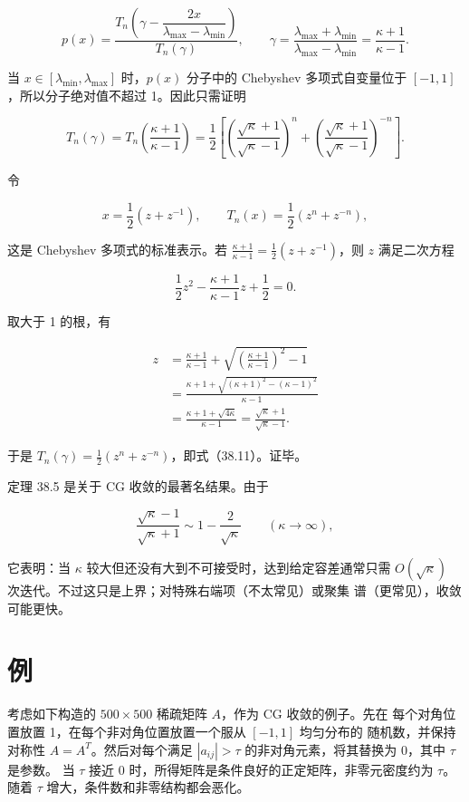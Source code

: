 \documentclass[UTF8,fontset=none,12pt]{ctexart}
\begin{document}
\[
p(x)=
\frac{T_n\!\left(\gamma-\dfrac{2x}{\lambda_{\max}-\lambda_{\min}}\right)}
{T_n(\gamma)},
\qquad
\gamma=\frac{\lambda_{\max}+\lambda_{\min}}
{\lambda_{\max}-\lambda_{\min}}
=\frac{\kappa+1}{\kappa-1}.
\]

当 $x\in[\lambda_{\min},\lambda_{\max}]$ 时，$p(x)$ 分子中的
Chebyshev 多项式自变量位于 $[-1,1]$，所以分子绝对值不超过 1。因此只需证明

\begin{equation}
T_n(\gamma)
=T_n\!\left(\frac{\kappa+1}{\kappa-1}\right)
=\frac12\left[
\left(\frac{\sqrt\kappa+1}{\sqrt\kappa-1}\right)^n+
\left(\frac{\sqrt\kappa+1}{\sqrt\kappa-1}\right)^{-n}
\right].
\tag{38.11}
\end{equation}

令

\[
x=\frac12(z+z^{-1}),\qquad
T_n(x)=\frac12(z^n+z^{-n}),
\]

这是 Chebyshev 多项式的标准表示。若
$\frac{\kappa+1}{\kappa-1}=\frac12(z+z^{-1})$，则 $z$ 满足二次方程

\[
\frac12z^2-\frac{\kappa+1}{\kappa-1}z+\frac12=0.
\]

取大于 1 的根，有

\[
\begin{aligned}
z
&=\frac{\kappa+1}{\kappa-1}
+\sqrt{\left(\frac{\kappa+1}{\kappa-1}\right)^2-1}\\
&=\frac{\kappa+1+\sqrt{(\kappa+1)^2-(\kappa-1)^2}}{\kappa-1}\\
&=\frac{\kappa+1+\sqrt{4\kappa}}{\kappa-1}
=\frac{\sqrt\kappa+1}{\sqrt\kappa-1}.
\end{aligned}
\]

于是 $T_n(\gamma)=\frac12(z^n+z^{-n})$，即式（38.11）。证毕。

定理 38.5 是关于 CG 收敛的最著名结果。由于

\[
\frac{\sqrt\kappa-1}{\sqrt\kappa+1}
\sim1-\frac{2}{\sqrt\kappa}
\qquad(\kappa\to\infty),
\]

它表明：当 $\kappa$ 较大但还没有大到不可接受时，达到给定容差通常只需
$O(\sqrt\kappa)$ 次迭代。不过这只是上界；对特殊右端项（不太常见）或聚集
谱（更常见），收敛可能更快。

\section*{例}

考虑如下构造的 $500\times500$ 稀疏矩阵 $A$，作为 CG 收敛的例子。先在
每个对角位置放置 1，在每个非对角位置放置一个服从 $[-1,1]$ 均匀分布的
随机数，并保持对称性 $A=A^T$。然后对每个满足
$|a_{ij}|>\tau$ 的非对角元素，将其替换为 0，其中 $\tau$ 是参数。
当 $\tau$ 接近 0 时，所得矩阵是条件良好的正定矩阵，非零元密度约为 $\tau$。
随着 $\tau$ 增大，条件数和非零结构都会恶化。
\end{document}

